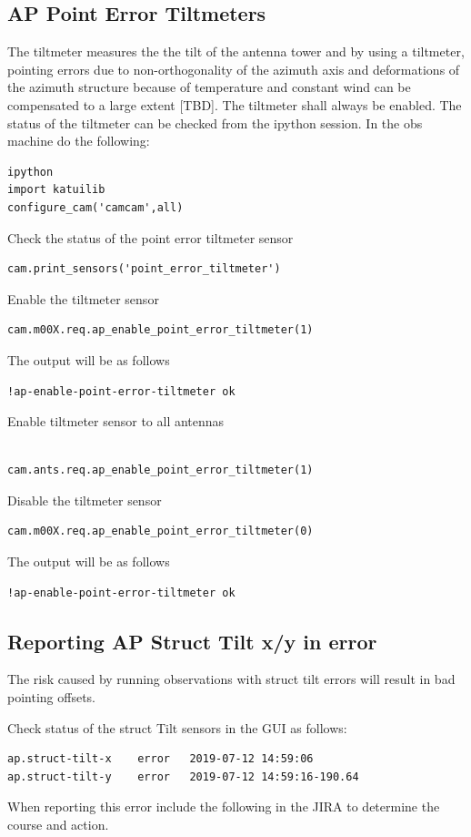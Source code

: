 \subsection{ AP Point Error Tiltmeters}
The tiltmeter measures the the tilt of the antenna tower and by using a tiltmeter, pointing errors due to non-orthogonality of the azimuth axis and deformations of the azimuth structure because of temperature and constant wind can be compensated to a large extent [TBD]. The tiltmeter shall always be enabled.  The status of the tiltmeter can be checked from the ipython session. In the obs  machine do the following:
\begin{lstlisting}[style=DOS]
ipython
import katuilib
configure_cam('camcam',all)
\end{lstlisting}
Check the status of the point error tiltmeter sensor
\begin{lstlisting}[style=DOS]
cam.print_sensors('point_error_tiltmeter')
\end{lstlisting}
Enable the tiltmeter sensor
\begin{lstlisting}[style=DOS]
cam.m00X.req.ap_enable_point_error_tiltmeter(1)
\end{lstlisting}
The output will be as follows
\begin{lstlisting}[style=DOS]
!ap-enable-point-error-tiltmeter ok
\end{lstlisting}
Enable  tiltmeter sensor to all antennas
\begin{lstlisting}[style=DOS]

cam.ants.req.ap_enable_point_error_tiltmeter(1)
\end{lstlisting}
Disable the tiltmeter sensor
\begin{lstlisting}[style=DOS]
cam.m00X.req.ap_enable_point_error_tiltmeter(0)
\end{lstlisting}
The output will be as follows
\begin{lstlisting}[style=DOS]
!ap-enable-point-error-tiltmeter ok
\end{lstlisting}
\subsection{ Reporting AP Struct Tilt x/y  in error}
The risk caused by running observations with struct tilt errors will result in bad pointing offsets. 

Check status of the struct Tilt sensors in the GUI as follows: 
\begin{lstlisting}[style=DOS]
ap.struct-tilt-x  	error 	2019-07-12 14:59:06
ap.struct-tilt-y  	error 	2019-07-12 14:59:16-190.64
\end{lstlisting}
When reporting this error include the following in the JIRA to determine the course and action.


